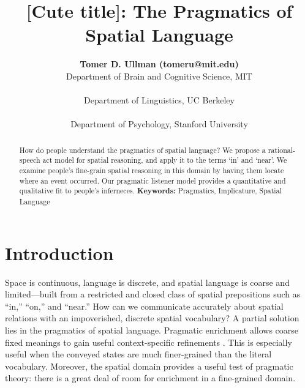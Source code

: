 \documentclass[10pt,letterpaper]{article}
\title{[Cute title]: The Pragmatics of Spatial Language}
\author{
{\large \bf Tomer D. Ullman (tomeru@mit.edu)} \\
  Department of Brain and Cognitive Science, MIT\\
  \And{\large \bf Yang Xu (yang\_xu\_ch@berkeley.edu)} \\
  Department of Linguistics, UC Berkeley \\
 \AND{\large \bf Noah D. Goodman (ngoodman@stanford.edu)} \\
  Department of Psychology, Stanford University\\
}
\newcommand{\ndg}[1]{\textcolor{Green}{[ndg: #1]}}
\begin{document}
\maketitle

\begin{abstract}

How do people understand the pragmatics of spatial language? 
We propose a rational-speech act model for spatial reasoning, and apply it to the terms `in' and `near'. We examine people's fine-grain spatial reasoning in this domain by having them locate where an event occurred. Our pragmatic listener model provides a quantitative and qualitative fit to people's inferneces. \textbf{Keywords:}
Pragmatics, Implicature, Spatial Language

\end{abstract}

\section{Introduction} 
Space is continuous, language is discrete, and spatial language is coarse and limited---built from a restricted and closed class of spatial prepositions \cite{talmy83,talmy00,landau93} such as ``in,'' ``on,'' and ``near.'' 
How can we communicate accurately about spatial relations with an impoverished, discrete spatial vocabulary?
A partial solution lies in the pragmatics of spatial language.
Pragmatic enrichment allows coarse fixed meanings to gain useful context-specific refinements \cite{grice75,horn84}.
This is especially useful when the conveyed states are much finer-grained than the literal vocabulary. Moreover, the spatial domain provides a useful test of pragmatic theory: there is a great deal of room for enrichment in a fine-grained domain.

%
\end{document}
